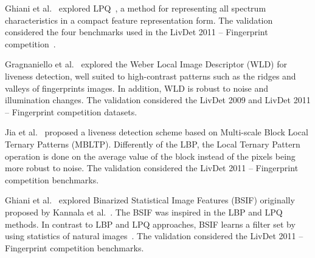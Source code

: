 


Ghiani et al.~\cite{Ghiani:ICPR:2012} explored LPQ~\cite{Ojansivu:ISP:2008}, a method for representing all spectrum characteristics in a compact feature representation form. The validation considered the four benchmarks used in the LivDet 2011 -- Fingerprint competition~\cite{Yambay:ICB:2012}.



Gragnaniello et al.~\cite{Gragnaniello:BIOMS:2013} explored the Weber Local Image Descriptor (WLD) for liveness detection, well suited to high-contrast patterns such as the ridges and valleys of fingerprints images. In addition, WLD is robust to noise and illumination changes. The validation considered the LivDet 2009 and LivDet 2011 -- Fingerprint competition datasets.


Jia et al.~\cite{Jia:ICB:2013} proposed a liveness detection scheme based on Multi-scale Block Local Ternary Patterns (MBLTP). 
Differently of the LBP, the Local Ternary Pattern operation is done on the average value of the block instead of the pixels being more robust to noise. 
The validation considered the LivDet 2011 -- Fingerprint competition benchmarks.

Ghiani et al.~\cite{Ghiani:BTAS:2013} explored Binarized Statistical Image Features (BSIF) originally proposed by Kannala et al.~\cite{Kannala:ICPR:2012}. The BSIF was inspired in the LBP and LPQ methods. In contrast to LBP and LPQ approaches, BSIF learns a filter set by using statistics of natural images~\cite{Hyvrinen:NIS:2009}. The validation considered the LivDet 2011 -- Fingerprint competition benchmarks.

